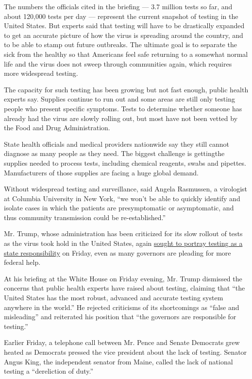 The numbers the officials cited in the briefing --- 3.7 million tests so
far, and about 120,000 tests per day --- represent the current snapshot
of testing in the United States. But experts said that testing will have
to be drastically expanded to get an accurate picture of how the virus
is spreading around the country, and to be able to stamp out future
outbreaks. The ultimate goal is to separate the sick from the healthy so
that Americans feel safe returning to a somewhat normal life and the
virus does not sweep through communities again, which requires more
widespread testing.

The capacity for such testing has been growing but not fast enough,
public health experts say. Supplies continue to run out and some areas
are still only testing people who present specific symptoms. Tests to
determine whether someone has already had the virus are slowly rolling
out, but most have not been vetted by the Food and Drug Administration.

State health officials and medical providers nationwide say they still
cannot diagnose as many people as they need. The biggest challenge is
gettingthe supplies needed to process tests, including chemical
reagents, swabs and pipettes. Manufacturers of those supplies are facing
a huge global demand.

Without widespread testing and surveillance, said Angela Rasmussen, a
virologist at Columbia University in New York, ``we won't be able to
quickly identify and isolate cases in which the patients are
presymptomatic or asymptomatic, and thus community transmission could be
re-established.''

Mr. Trump, whose administration has been criticized for its slow rollout
of tests as the virus took hold in the United States, again
\href{https://twitter.com/realDonaldTrump/status/1251186839983132673?s=20}{sought
to portray testing as a state responsibility} on Friday, even as many
governors are pleading for more federal help.

At his briefing at the White House on Friday evening, Mr. Trump
dismissed the concerns that public health experts have raised about
testing, claiming that ``the United States has the most robust, advanced
and accurate testing system anywhere in the world.'' He rejected
criticisms of its shortcomings as ``false and misleading'' and
reiterated his position that ``the governors are responsible for
testing.''

Earlier Friday, a telephone call between Mr. Pence and Senate Democrats
grew heated as Democrats pressed the vice president about the lack of
testing. Senator Angus King, the independent senator from Maine, called
the lack of national testing a ``dereliction of duty.''

